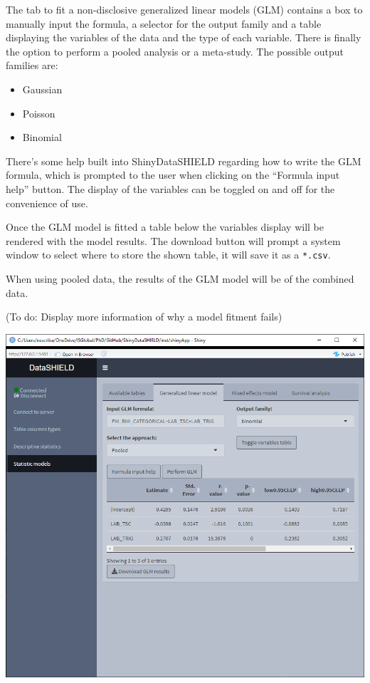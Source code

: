 \documentclass[
]{book}
\providecommand{\tightlist}{%
  \setlength{\itemsep}{0pt}\setlength{\parskip}{0pt}}
\begin{document}
The tab to fit a non-disclosive generalized linear models (GLM) contains a box to manually input the formula, a selector for the output family and a table displaying the variables of the data and the type of each variable. There is finally the option to perform a pooled analysis or a meta-study. The possible output families are:

\begin{itemize}
\tightlist
\item
  Gaussian
\item
  Poisson
\item
  Binomial
\end{itemize}

There's some help built into ShinyDataSHIELD regarding how to write the GLM formula, which is prompted to the user when clicking on the ``Formula input help'' button. The display of the variables can be toggled on and off for the convenience of use.

Once the GLM model is fitted a table below the variables display will be rendered with the model results. The download button will prompt a system window to select where to store the shown table, it will save it as a \texttt{*.csv}.

When using pooled data, the results of the GLM model will be of the combined data.

(To do: Display more information of why a model fitment fails)

\includegraphics{images/stat_models1.png}
\end{document}

